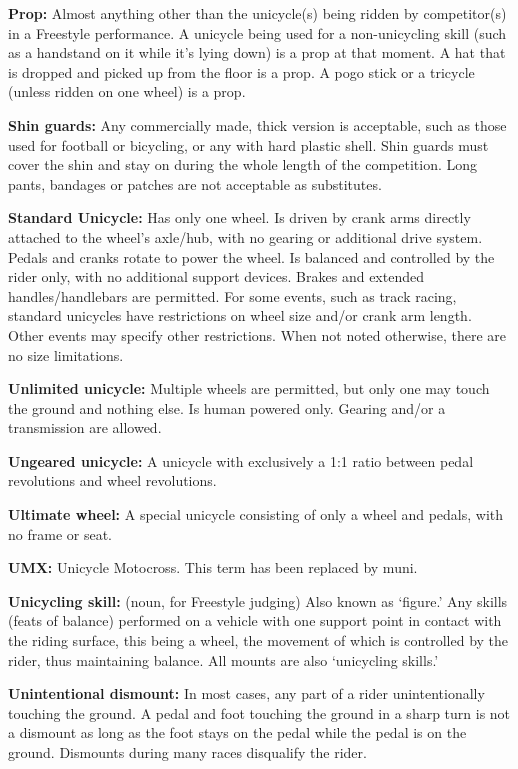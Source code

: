 \textbf{Prop:} Almost anything other than the unicycle(s) being ridden by competitor(s) in a Freestyle performance.
A unicycle being used for a non-unicycling skill (such as a handstand on it while it's lying down) is a prop at that moment.
A hat that is dropped and picked up from the floor is a prop.
A pogo stick or a tricycle (unless ridden on one wheel) is a prop.

\textbf{Shin guards:} Any commercially made, thick version is acceptable, such as those used for football or bicycling, or any with hard plastic shell.
Shin guards must cover the shin and stay on during the whole length of the competition.
Long pants, bandages or patches are not acceptable as substitutes.

\textbf{Standard Unicycle:} Has only one wheel.
Is driven by crank arms directly attached to the wheel's axle/hub, with no gearing or additional drive system.
Pedals and cranks rotate to power the wheel.
Is balanced and controlled by the rider only, with no additional support devices.
Brakes and extended handles/handlebars are permitted.
For some events, such as track racing, standard unicycles have restrictions on wheel size and/or crank arm length.
Other events may specify other restrictions.
When not noted otherwise, there are no size limitations.

\textbf{Unlimited unicycle:} Multiple wheels are permitted, but only one may touch the ground and nothing else.
Is human powered only.
Gearing and/or a transmission are allowed.

\textbf{Ungeared unicycle:} A unicycle with exclusively a 1:1 ratio between pedal revolutions and wheel revolutions.

\textbf{Ultimate wheel:} A special unicycle consisting of only a wheel and pedals, with no frame or seat.

\textbf{UMX:} Unicycle Motocross.
This term has been replaced by muni.

\textbf{Unicycling skill:} (noun, for Freestyle judging) Also known as `figure.' Any skills (feats of balance) performed on a vehicle with one support point in contact with the riding surface, this being a wheel, the movement of which is controlled by the rider, thus maintaining balance.
All mounts are also `unicycling skills.' 

\textbf{Unintentional dismount:} In most cases, any part of a rider unintentionally touching the ground.
A pedal and foot touching the ground in a sharp turn is not a dismount as long as the foot stays on the pedal while the pedal is on the ground.
Dismounts during many races disqualify the rider.

